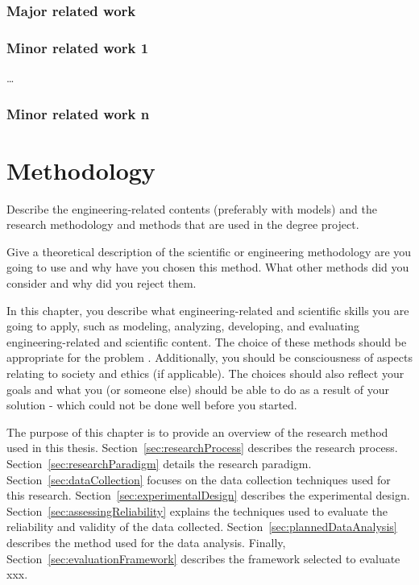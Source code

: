 \documentclass[english]{kththesis}
\begin{document}
\subsection{Major related work}

\subsection{Minor related work 1}


…
\subsection{Minor related work n}


\cleardoublepage


\chapter{Methodology}
\label{ch:methods}

Describe the engineering-related contents (preferably with models) and the research methodology and methods that are used in the degree project. 

Give a theoretical description of the scientific or engineering methodology are you going to use and why have you chosen this method. What other methods did you consider and why did you reject them.

In this chapter, you describe what engineering-related and scientific skills you are going to apply, such as modeling, analyzing, developing, and evaluating engineering-related and scientific content. The choice of these methods should be appropriate for the problem . Additionally, you should be consciousness of aspects relating to society and ethics (if applicable). The choices should also reflect your goals and what you (or someone else) should be able to do as a result of your solution - which could not be done well before you started.

The purpose of this chapter is to provide an overview of the research method
used in this thesis. Section~\ref{sec:researchProcess} describes the research
process. Section~\ref{sec:researchParadigm} details the research
paradigm. Section~\ref{sec:dataCollection} focuses on the data collection
techniques used for this research. Section~\ref{sec:experimentalDesign}
describes the experimental design. Section~\ref{sec:assessingReliability}
explains the techniques used to evaluate the reliability and validity of the
data collected. Section~\ref{sec:plannedDataAnalysis} describes the method
used for the data analysis. Finally, Section~\ref{sec:evaluationFramework}
describes the framework selected to evaluate xxx.
\end{document}
